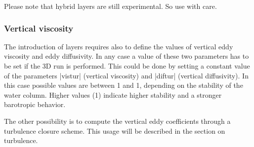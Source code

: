 Please note that hybrid layers are still experimental. So use with care.




\subsubsection{Vertical viscosity}

The introduction of layers requires also to define the values of
vertical eddy viscosity and eddy diffusivity.  In any case a value of
these two parameters has to be set if the 3D run is performed. This
could be done by setting a constant value of the parameters |vistur|
(vertical viscosity) and |diftur| (vertical diffusivity). In this case
possible values are between 1 and 1, depending on the
stability of the water column. Higher values (1) indicate higher
stability and a stronger barotropic behavior.

The other possibility is to compute the vertical eddy coefficients through
a turbulence closure scheme. This usage will be described in the section
on turbulence.

